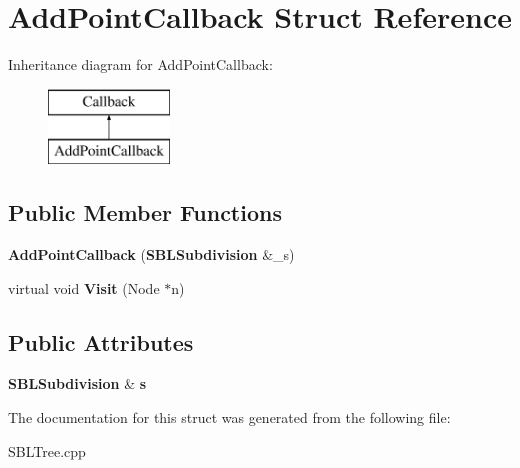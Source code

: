 \section{Add\+Point\+Callback Struct Reference}
\label{structAddPointCallback}
Inheritance diagram for Add\+Point\+Callback\+:\begin{figure}[H]
\begin{center}
\leavevmode
\includegraphics[height=2.000000cm]{structAddPointCallback}
\end{center}
\end{figure}
\subsection*{Public Member Functions}
\begin{DoxyCompactItemize}
\item 
{\bfseries Add\+Point\+Callback} ({\bf S\+B\+L\+Subdivision} \&\+\_\+s)\label{structAddPointCallback_aae0bfd6a9ecd5d7d17b8528998e4f60b}

\item 
virtual void {\bfseries Visit} (Node $\ast$n)\label{structAddPointCallback_a089501f29df7561f5fa80373f104faea}

\end{DoxyCompactItemize}
\subsection*{Public Attributes}
\begin{DoxyCompactItemize}
\item 
{\bf S\+B\+L\+Subdivision} \& {\bfseries s}\label{structAddPointCallback_a229afd715b5ff8ecc308ef267215d879}

\end{DoxyCompactItemize}


The documentation for this struct was generated from the following file\+:\begin{DoxyCompactItemize}
\item 
S\+B\+L\+Tree.\+cpp\end{DoxyCompactItemize}
